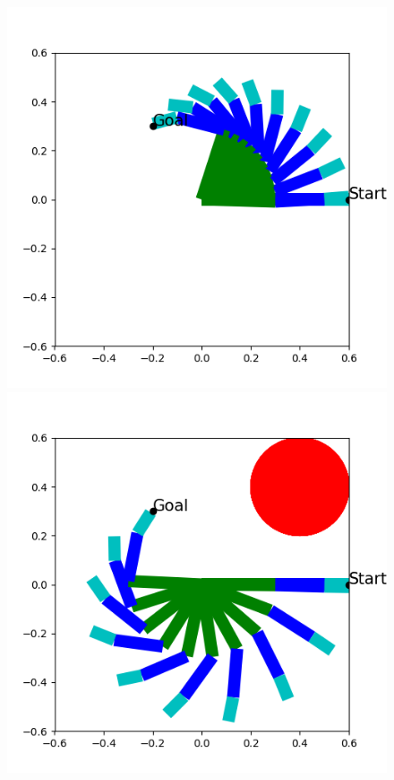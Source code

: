 \vspace{-2mm}
\begin{figure}[htbp]
  \begin{minipage}[!h]{0.32\columnwidth}
    \begin{center}
      \includegraphics[width=1.0\columnwidth]{figs/2dof_without_obstacle}
    \end{center}
  \end{minipage}
  \begin{minipage}[!h]{0.32\columnwidth}
    \begin{center}
      \includegraphics[width=1.0\columnwidth]{figs/2dof_with_obstacle}

\end{center}
\end{minipage}
\end{figure}
